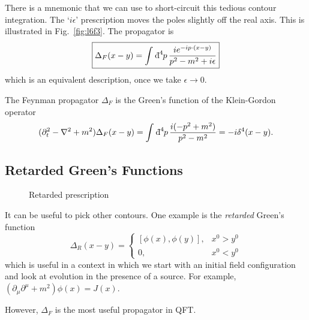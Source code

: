 There is a mnemonic that we can use to short-circuit this tedious contour integration.
The `$i \epsilon$' prescription moves the poles slightly off the real axis. This is illustrated in Fig.~\ref{fig:l6f3}.
The propagator is
\begin{equation}
  \boxed{\Delta_F(x - y) = \int_{}^{} \bdd[4]{p} \frac{i e^{-i p \cdot (x - y)}}{p^2 - m^2 + i \epsilon}}
\end{equation}
which is an equivalent description, once we take $\epsilon \to 0$.

The Feynman propagator $\Delta_F$ is the Green's function of the Klein-Gordon operator
\begin{equation}
  (\partial_t^2 - \laplacian + m^2) \Delta_F(x - y) = \int_{}^{} \bdd[4]{p} \frac{i (-p^2 + m^2)}{p^2 - m^2} = -i \delta^4 (x- y).
\end{equation}

\subsection{Retarded Green's Functions}%
\label{sub:retarded_green_s_functions}

\begin{wrapfigure}{R}{0.4\columnwidth}
  \centering
  \def\svgwidth{0.35\columnwidth}
  
  \caption{Retarded prescription}
  \label{fig:l6f4}
\end{wrapfigure}

It can be useful to pick other contours. One example is the \emph{retarded} Green's function
\begin{equation}
  \Delta_R (x - y) = 
  \begin{cases}
    [\phi(x), \phi(y)], & x^0 > y^0 \\
    0, & x^0 < y^0
  \end{cases}
\end{equation}
which is useful in a context in which we start with  an initial field configuration and look at evolution in the presence of a source. For example, $(\partial_\mu \partial^\mu + m^2 )\phi(x) = J(x)$.

However, $\Delta_F$ is the most useful propagator in QFT.
